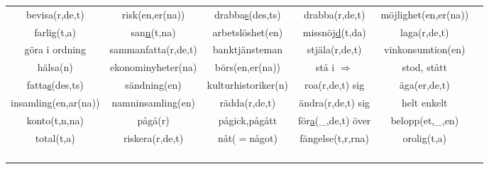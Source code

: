\begin{center}
\begin{adjustwidth}{-2.6cm}{}
\begin{tabular}{|c c c c c c|}
            bevisa(r,de,t) & risk(en,er(na)) & drabba\underline{s}(des,ts) & drabba(r,de,t) & möjlighet(en,er(na)) &  \\
            farlig(t,a) & san\underline{n}(t,na) & arbetslöshet(en) & missnöj\underline{d}(t,da) & laga(r,de,t) &  \\
            göra i ordning & sammanfatta(r,de,t) & banktjänsteman & stjäla(r,de,t) & vinkonsumtion(en) &  \\
            hälsa(n) & ekonominyheter(na) & börs(en,er(na)) & stå i $\Rightarrow$ & stod, stått &  \\
            fatta\underline{s}(des,ts) & sändning(en) & kulturhistoriker(n) & roa(r,de,t) sig & äga(er,de,t) &  \\
            insamling(en,ar(na)) & namninsamling(en) & rädda(r,de,t) & ändra(r,de,t) sig & helt enkelt &  \\
            konto(t,n,na) & pågå(r) & pågick,pågått & för\underline{a}(\_,de,t) över & belopp(et,\_,en) &  \\
            total(t,a) & riskera(r,de,t) & nåt($=$något) & fängelse(t,r,rna) & orolig(t,a) &  \\
             &  &  &  &  &  \\
             &  &  &  &  &  \\
             &  &  &  &  &  \\
             &  &  &  &  &  \\
            \hline
        \end{tabular}
    \end{adjustwidth}
\end{center}

